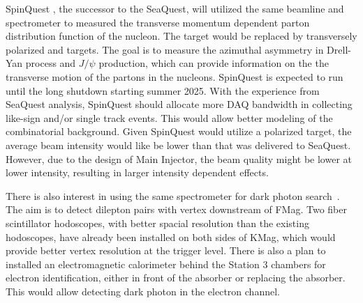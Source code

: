 \documentclass[../main.tex]{subfiles}
\begin{document}
SpinQuest \cite{geesaman2014}, the successor to the SeaQuest, will utilized the same beamline and
spectrometer to measured the transverse momentum dependent parton distribution
function of the nucleon. The target would be replaced by transversely polarized 
and  targets. The goal is to measure the azimuthal asymmetry in
Drell-Yan process and $J/\psi$ production, which can provide information on the
the transverse motion of the partons in the nucleons.
SpinQuest is expected to run until the long shutdown starting summer 2025. With the experience
from SeaQuest analysis, SpinQuest should allocate more DAQ bandwidth in collecting
like-sign and/or single track events. This would allow better modeling of the combinatorial
background. Given SpinQuest would utilize a polarized target,
the average beam intensity would like be lower than that was delivered to SeaQuest.
However, due to the design of Main Injector,
the beam quality might be lower at lower intensity, resulting in larger intensity dependent effects.

There is also interest in using the same spectrometer for dark photon search~\cite{apyan2022}.
The aim is to detect dilepton pairs with vertex downstream of FMag.
Two fiber scintillator hodoscopes, with better spacial resolution than the existing hodoscopes,
have already been installed on both sides of KMag,
which would provide better vertex resolution at the trigger level.
There is also a plan to installed an electromagnetic calorimeter behind the
Station 3 chambers for electron identification, either in front of the absorber or replacing the absorber.
This would allow detecting dark photon in the electron
channel.

\ifSubfilesClassLoaded{ \printbibliography[heading=bibintoc,title={References}]}{}
\end{document}
